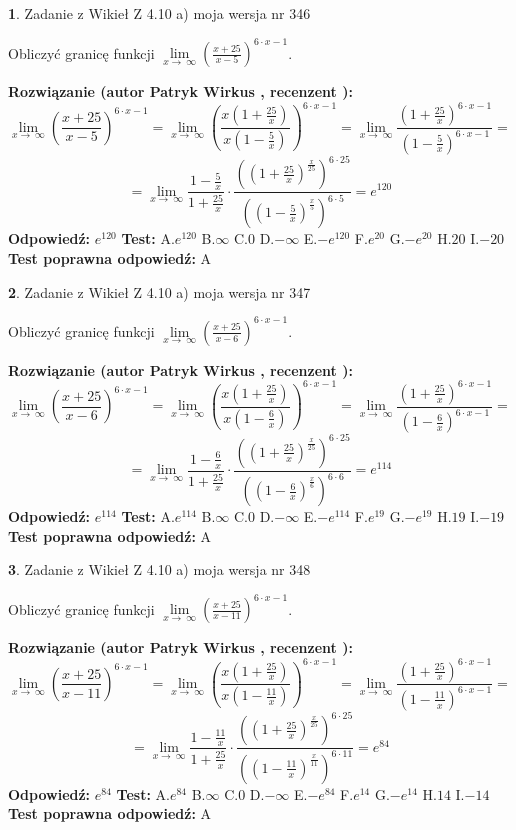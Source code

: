 \documentclass[12pt, a4paper]{article}
\theoremstyle{definition} %
\newtheorem{zad}{}
\newcommand{\zadStart}[1]{\begin{zad}#1\newline}
\newcommand{\zadStop}{\end{zad}}
\newcommand{\rozwStart}[2]{\noindent \textbf{Rozwiązanie (autor #1 , recenzent #2): }\newline}
\newcommand{\rozwStop}{\newline}
\newcommand{\odpStart}{\noindent \textbf{Odpowiedź:}\newline}
\newcommand{\odpStop}{\newline}
\newcommand{\testStart}{\noindent \textbf{Test:}\newline}
\newcommand{\testStop}{\newline}
\newcommand{\kluczStart}{\noindent \textbf{Test poprawna odpowiedź:}\newline}
\newcommand{\kluczStop}{\newline}
\begin{document}
\zadStart{Zadanie z Wikieł Z 4.10 a) moja wersja nr 346}

Obliczyć granicę funkcji  $\lim\limits_{x\to\ \infty}(\frac{x+25}{x-5})^{6\cdot x-1}$.
\zadStop
\rozwStart{Patryk Wirkus}{}
$$\lim\limits_{x\to\ \infty}(\frac{x+25}{x-5})^{6\cdot x-1} = \lim\limits_{x\to\ \infty}(\frac{x(1+\frac{25}{x})}{x(1-\frac{5}{x})})^{6\cdot x-1}=\lim\limits_{x\to\ \infty}\frac{(1+\frac{25}{x})^{6\cdot x-1}}{(1-\frac{5}{x})^{6\cdot x-1}}=$$
$$=\lim\limits_{x\to\ \infty}\frac{1-\frac{5}{x}}{1+\frac{25}{x}}\cdot\frac{((1+\frac{25}{x})^{\frac{x}{25}})^{6\cdot25}}{((1-\frac{5}{x})^{\frac{x}{5}})^{6\cdot5}}=e^{120}$$
\rozwStop
\odpStart
$e^{120}$
\odpStop
\testStart
A.$e^{120}$ B.$\infty$ C.$0$ D.$-\infty$ E.$-e^{120}$
F.$e^{20}$ G.$-e^{20}$
H.$20$
I.$-20$
\testStop
\kluczStart
A
\kluczStop



\zadStart{Zadanie z Wikieł Z 4.10 a) moja wersja nr 347}

Obliczyć granicę funkcji  $\lim\limits_{x\to\ \infty}(\frac{x+25}{x-6})^{6\cdot x-1}$.
\zadStop
\rozwStart{Patryk Wirkus}{}
$$\lim\limits_{x\to\ \infty}(\frac{x+25}{x-6})^{6\cdot x-1} = \lim\limits_{x\to\ \infty}(\frac{x(1+\frac{25}{x})}{x(1-\frac{6}{x})})^{6\cdot x-1}=\lim\limits_{x\to\ \infty}\frac{(1+\frac{25}{x})^{6\cdot x-1}}{(1-\frac{6}{x})^{6\cdot x-1}}=$$
$$=\lim\limits_{x\to\ \infty}\frac{1-\frac{6}{x}}{1+\frac{25}{x}}\cdot\frac{((1+\frac{25}{x})^{\frac{x}{25}})^{6\cdot25}}{((1-\frac{6}{x})^{\frac{x}{6}})^{6\cdot6}}=e^{114}$$
\rozwStop
\odpStart
$e^{114}$
\odpStop
\testStart
A.$e^{114}$ B.$\infty$ C.$0$ D.$-\infty$ E.$-e^{114}$
F.$e^{19}$ G.$-e^{19}$
H.$19$
I.$-19$
\testStop
\kluczStart
A
\kluczStop



\zadStart{Zadanie z Wikieł Z 4.10 a) moja wersja nr 348}

Obliczyć granicę funkcji  $\lim\limits_{x\to\ \infty}(\frac{x+25}{x-11})^{6\cdot x-1}$.
\zadStop
\rozwStart{Patryk Wirkus}{}
$$\lim\limits_{x\to\ \infty}(\frac{x+25}{x-11})^{6\cdot x-1} = \lim\limits_{x\to\ \infty}(\frac{x(1+\frac{25}{x})}{x(1-\frac{11}{x})})^{6\cdot x-1}=\lim\limits_{x\to\ \infty}\frac{(1+\frac{25}{x})^{6\cdot x-1}}{(1-\frac{11}{x})^{6\cdot x-1}}=$$
$$=\lim\limits_{x\to\ \infty}\frac{1-\frac{11}{x}}{1+\frac{25}{x}}\cdot\frac{((1+\frac{25}{x})^{\frac{x}{25}})^{6\cdot25}}{((1-\frac{11}{x})^{\frac{x}{11}})^{6\cdot11}}=e^{84}$$
\rozwStop
\odpStart
$e^{84}$
\odpStop
\testStart
A.$e^{84}$ B.$\infty$ C.$0$ D.$-\infty$ E.$-e^{84}$
F.$e^{14}$ G.$-e^{14}$
H.$14$
I.$-14$
\testStop
\kluczStart
A
\kluczStop
\end{document}
